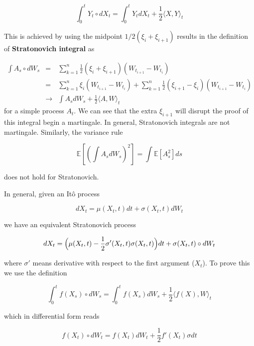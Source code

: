 \documentclass[11pt,a4paper]{article}
\begin{document}
\begin{equation}
    \int_0^t Y_t \circ dX_t = \int_0^t Y_t dX_t + \frac{1}{2}\langle X,Y \rangle_t
\end{equation}


This is achieved by using the midpoint $1/2(\xi_i+\xi_{i+1})$ results in the definition of \textbf{Stratonovich integral} as

\begin{eqnarray}
    \int A_s \circ dW_s &=& \sum_{k = 1}^{n}\frac{1}{2}(\xi_i+\xi_{i+1})(W_{t_{i+1}}-W_{t_i}) \\
    &=&\sum_{k = 1}^{n}\xi_i(W_{t_{i+1}}-W_{t_i}) + \sum_{k = 1}^{n}\frac{1}{2}(\xi_{i+1}-\xi_i)(W_{t_{i+1}}-W_{t_i}) \\
    &\to &\int A_s dW_s + \frac{1}{2}\langle A,W \rangle_t
\end{eqnarray}
for a simple process $A_t$. 
We can see that the extra $\xi_{i+1}$ will disrupt the proof of this integral begin a martingale. In general, Stratonovich integrals are not martingale. Similarly, the variance rule 

\begin{equation}
    \mathbb{E}[(\int A_sdW_s)^2] = \int \mathbb{E}[A_s^2] ds
\end{equation}

does not hold for Stratonovich. 

In general, given an It\^{o} process

\begin{equation}
    dX_t = \mu(X_t,t)dt+\sigma(X_t,t)dW_t
\end{equation}

we have an equivalent Stratonovich process

\begin{equation}
    dX_t = \Bigl(\mu(X_t,t)-\frac{1}{2}\sigma'(X_t,t)\sigma(X_t,t)\Bigl)dt+\sigma(X_t,t)\circ dW_t
\end{equation}

where $\sigma'$ means derivative with respect to the first argument ($X_t$). To prove this we use the definition

\begin{equation}
    \int_{0}^{t} f(X_s) \circ dW_s = \int_0^t f(X_s) dW_s + \frac{1}{2}\langle f(X),W \rangle_t
\end{equation}

which in differential form reads

\begin{equation}
    f(X_t) \circ dW_t =  f(X_t) dW_t  + \frac{1}{2}f'(X_t)\sigma dt
\end{equation}
\end{document}
